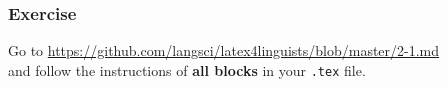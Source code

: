 %
%
%



\begin{frame}[fragile]
\frametitle{Exercise}


Go to \url{https://github.com/langsci/latex4linguists/blob/master/2-1.md}\\
and follow the instructions of \textbf{all blocks} in your \texttt{.tex} file.


\end{frame}


%
%
%


%
%	
%
%
%
